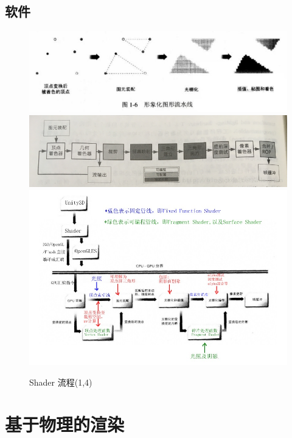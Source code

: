 \documentclass[UTF8,a4paper,12pt]{ctexbook}
\begin{document}
	\section{软件}   
		\begin{figure}[H]
			\centering
			\includegraphics[scale=0.59]{ShaderPro}
			\includegraphics[scale=0.69]{ShaderProc}
			\includegraphics[scale=0.59]{ShaderPro2}
			\caption{Shader 流程(1,4)}
		\end{figure}

\chapter{基于物理的渲染}
\end{document}
